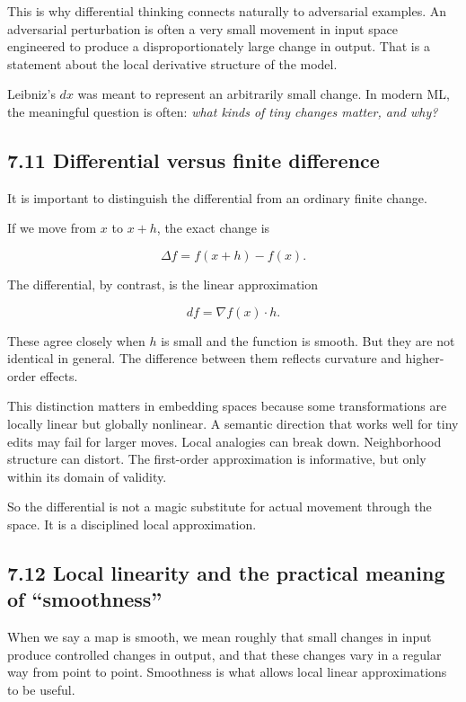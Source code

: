 This is why differential thinking connects naturally to adversarial
examples. An adversarial perturbation is often a very small movement in
input space engineered to produce a disproportionately large change in
output. That is a statement about the local derivative structure of the
model.

Leibniz's \(dx\) was meant to represent an arbitrarily small change. In
modern ML, the meaningful question is often: \emph{what kinds of tiny
changes matter, and why?}

\hypertarget{differential-versus-finite-difference}{%
\subsection{7.11 Differential versus finite
difference}\label{differential-versus-finite-difference}}

It is important to distinguish the differential from an ordinary finite
change.

If we move from \(x\) to \(x+h\), the exact change is

\[ 
\Delta f = f(x+h)-f(x).
\]

The differential, by contrast, is the linear approximation

\[
df = \nabla f(x)\cdot h.
\]

These agree closely when \(h\) is small and the function is smooth. But
they are not identical in general. The difference between them reflects
curvature and higher-order effects.

This distinction matters in embedding spaces because some
transformations are locally linear but globally nonlinear. A semantic
direction that works well for tiny edits may fail for larger moves.
Local analogies can break down. Neighborhood structure can distort. The
first-order approximation is informative, but only within its domain of
validity.

So the differential is not a magic substitute for actual movement
through the space. It is a disciplined local approximation.

\hypertarget{local-linearity-and-the-practical-meaning-of-smoothness}{%
\subsection{7.12 Local linearity and the practical meaning of
``smoothness''}\label{local-linearity-and-the-practical-meaning-of-smoothness}}

When we say a map is smooth, we mean roughly that small changes in input
produce controlled changes in output, and that these changes vary in a
regular way from point to point. Smoothness is what allows local linear
approximations to be useful.

